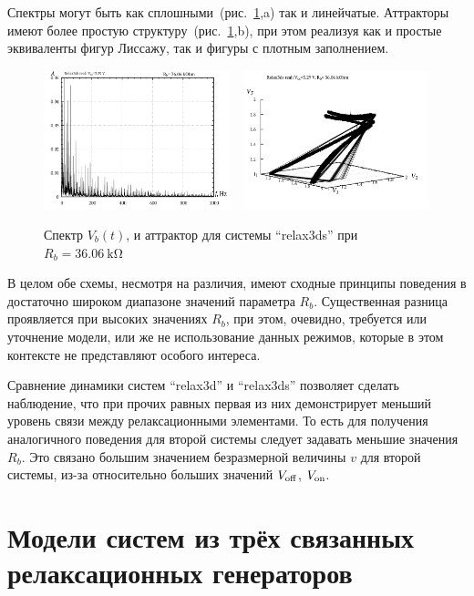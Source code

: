 Спектры могут быть как сплошными~(рис.~\ref{atu:f:relax3ds_f_36060},a)
так и линейчатые.
Аттракторы имеют более простую структуру~(рис.~\ref{atu:f:relax3ds_f_36060},b),
при этом реализуя как и простые эквиваленты фигур Лиссажу,
так и фигуры с плотным заполнением.

\begin{figure}[htb!]
  \centerline{
    \includegraphics[width=0.48\textwidth]{p/relax3ds_f_036060.png}
    ~
    \includegraphics[width=0.48\textwidth]{p/relax3ds_v1v2v3_036060.png}
  }
  \caption{Спектр $V_b(t)$, и аттрактор для системы ``relax3ds'' при $R_b=\SI{36.06}{\kilo\ohm}$ }
  \label{atu:f:relax3ds_f_36060}
\end{figure}

В целом обе схемы, несмотря на различия, имеют сходные принципы поведения
в достаточно широком диапазоне значений параметра $R_b$.
Существенная разница проявляется при высоких значениях $R_b$,
при этом, очевидно, требуется или уточнение модели, или же
не использование данных режимов, которые в этом контексте не представляют
особого интереса.

Сравнение динамики систем ``relax3d'' и ``relax3ds''
позволяет сделать наблюдение,
что при прочих равных первая из них демонстрирует меньший уровень связи между
релаксационными элементами. То есть для получения
аналогичного поведения для второй системы следует задавать меньшие значения $R_b$.
Это связано большим значением безразмерной величины $v$ для второй системы,
из-за относительно больших значений $V_\mathrm{off}$, $V_\mathrm{on}$.


\section{Модели систем из трёх связанных релаксационных генераторов}

